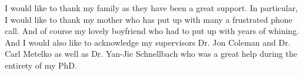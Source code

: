 
\begin{acknowledgements}      

I would like to thank my family as they have been a great support. In particular, I would like to thank my mother who has put up with many a frustrated phone call. And of course my lovely boyfriend who had to put up with years of whining. And I would also like to acknowledge my supervisors Dr. Jon Coleman and Dr. Carl Metelko as well as Dr. Yan-Jie Schnellbach who was a great help during the entirety of my PhD. 


\end{acknowledgements}
